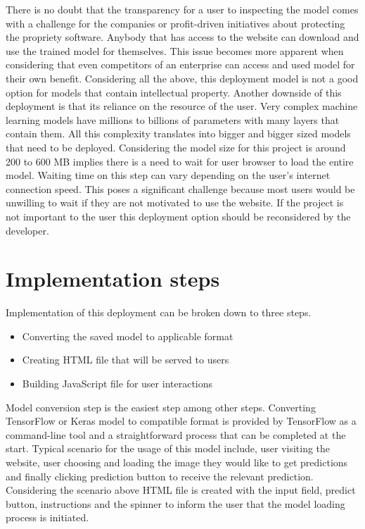 There is no doubt that the transparency for a user to inspecting the model comes with a challenge for the companies or profit-driven initiatives about protecting the propriety software.
Anybody that has access to the website can download and use the trained model for themselves.
This issue becomes more apparent when considering that even competitors of an enterprise can access and used model for their own benefit.
Considering all the above, this deployment model is not a good option for models that contain intellectual property.
Another downside of this deployment is that its reliance on the resource of the user.
Very complex machine learning models have millions to billions of parameters with many layers that contain them.
All this complexity translates into bigger and bigger sized models that need to be deployed. 
Considering the model size for this project is around 200 to 600 MB
implies there is a need to wait for user browser to load the entire model.
Waiting time on this step can vary depending on the user's internet connection speed.
This poses a significant challenge because most users would be unwilling to wait if they are not motivated to use the website.
If the project is not important to the user this deployment option should be reconsidered by the developer.

\section{Implementation steps}
Implementation of this deployment can be broken down to three steps.

\begin{itemize}
    \item Converting the saved model to applicable format 
    \item Creating HTML file that will be served to users 
    \item Building JavaScript file for user interactions
\end{itemize}

Model conversion step is the easiest step among other steps.
Converting TensorFlow or Keras model to compatible format is provided by TensorFlow as a command-line tool and a straightforward process that can be completed at the start.
Typical scenario for the usage of this model include, user visiting the website, user choosing and loading the image they would like to get predictions and finally clicking prediction button to receive the relevant prediction.
Considering the scenario above HTML file is created with the input field, predict button, instructions and the spinner to inform the user that the model loading process is initiated.

